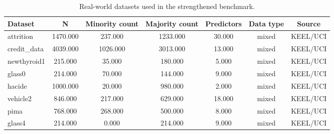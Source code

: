 \begin{table}[htb]
\centering
\caption{Real-world datasets used in the strengthened benchmark.}
\label{tab:datasets}
\small
\begin{tabular}{lcccccc}
\toprule
Dataset & N & Minority count & Majority count & Predictors & Data type & Source
\\
\midrule
attrition & 1470.000 & 237.000 & 1233.000 & 30.000 & mixed & KEEL/UCI
\\
credit_data & 4039.000 & 1026.000 & 3013.000 & 13.000 & mixed & KEEL/UCI
\\
newthyroid1 & 215.000 & 35.000 & 180.000 & 5.000 & mixed & KEEL/UCI
\\
glass0 & 214.000 & 70.000 & 144.000 & 9.000 & mixed & KEEL/UCI
\\
hacide & 1000.000 & 20.000 & 980.000 & 2.000 & mixed & KEEL/UCI
\\
vehicle2 & 846.000 & 217.000 & 629.000 & 18.000 & mixed & KEEL/UCI
\\
pima & 768.000 & 268.000 & 500.000 & 8.000 & mixed & KEEL/UCI
\\
glass4 & 214.000 & 0.000 & 214.000 & 9.000 & mixed & KEEL/UCI
\\
\bottomrule
\end{tabular}
\end{table}
